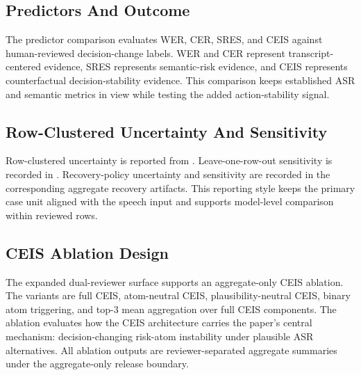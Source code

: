 \subsection{Predictors And Outcome}

The predictor comparison evaluates WER, CER, SRES, and CEIS against human-reviewed decision-change labels. WER and CER represent transcript-centered evidence, SRES represents semantic-risk evidence, and CEIS represents counterfactual decision-stability evidence. This comparison keeps established ASR and semantic metrics in view while testing the added action-stability signal.

\subsection{Row-Clustered Uncertainty And Sensitivity}

Row-clustered uncertainty is reported from . Leave-one-row-out sensitivity is recorded in . Recovery-policy uncertainty and sensitivity are recorded in the corresponding aggregate recovery artifacts. This reporting style keeps the primary case unit aligned with the speech input and supports model-level comparison within reviewed rows.

\subsection{CEIS Ablation Design}

The expanded dual-reviewer surface supports an aggregate-only CEIS ablation. The variants are full CEIS, atom-neutral CEIS, plausibility-neutral CEIS, binary atom triggering, and top-3 mean aggregation over full CEIS components. The ablation evaluates how the CEIS architecture carries the paper's central mechanism: decision-changing risk-atom instability under plausible ASR alternatives. All ablation outputs are reviewer-separated aggregate summaries under the aggregate-only release boundary.
